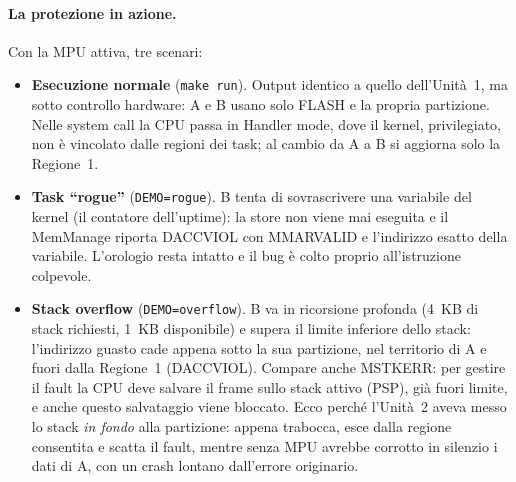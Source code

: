 \paragraph*{La protezione in azione.}
Con la MPU attiva, tre scenari:
\begin{itemize}
  \item \textbf{Esecuzione normale} (\texttt{make run}). Output identico a quello dell'Unità~1,
    ma sotto controllo hardware: A e B usano solo FLASH e la propria partizione. Nelle system
    call la CPU passa in Handler mode, dove il kernel, privilegiato, non è vincolato dalle
    regioni dei task; al cambio da A a B si aggiorna solo la Regione~1.
  \item \textbf{Task ``rogue''} (\texttt{DEMO=rogue}). B tenta di sovrascrivere una variabile
    del kernel (il contatore dell'uptime): la store non viene mai eseguita e il MemManage
    riporta DACCVIOL con MMARVALID e l'indirizzo esatto della variabile. L'orologio resta
    intatto e il bug è colto proprio all'istruzione colpevole.
  \item \textbf{Stack overflow} (\texttt{DEMO=overflow}). B va in ricorsione profonda (4~KB di
    stack richiesti, 1~KB disponibile) e supera il limite inferiore dello stack: l'indirizzo
    guasto cade appena sotto la sua partizione, nel territorio di A e fuori dalla Regione~1
    (DACCVIOL). Compare anche MSTKERR: per gestire il fault la CPU deve salvare il frame sullo
    stack attivo (PSP), già fuori limite, e anche questo salvataggio viene bloccato. Ecco perché
    l'Unità~2 aveva messo lo stack \emph{in fondo} alla partizione: appena trabocca, esce dalla
    regione consentita e scatta il fault, mentre senza MPU avrebbe corrotto in silenzio i dati
    di A, con un crash lontano dall'errore originario.
\end{itemize}


